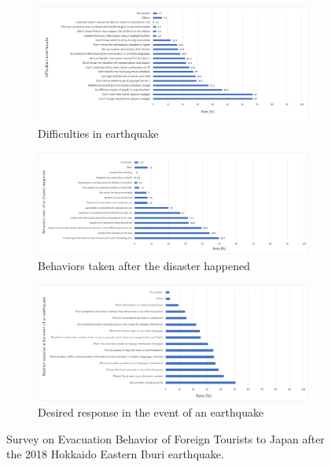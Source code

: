 \begin{figure}[h]
  \begin{subfigure}{\textwidth}
    \includegraphics[width=\linewidth]{Figure/Figure2a.png}
    \caption{Difficulties in earthquake}
    \label{fig2a}
  \end{subfigure}
  \begin{subfigure}{\textwidth}
    \includegraphics[width=\linewidth]{Figure/Figure2b.png}
    \caption{Behaviors taken after the disaster happened}
    \label{fig2b}
  \end{subfigure}
  \begin{subfigure}{\textwidth}
    \includegraphics[width=\linewidth]{Figure/Figure2c.png}
    \caption{Desired response in the event of an earthquake}
    \label{fig2c}
  \end{subfigure}
  \centering
  \caption[Survey on Evacuation Behavior of Foreign Tourists to Japan after the 2018 Hokkaido Eastern Iburi earthquake.]{Survey on Evacuation Behavior of Foreign Tourists to Japan after the 2018 Hokkaido Eastern Iburi earthquake.\protect\footnotemark }
  \label{fig2}
\end{figure}
